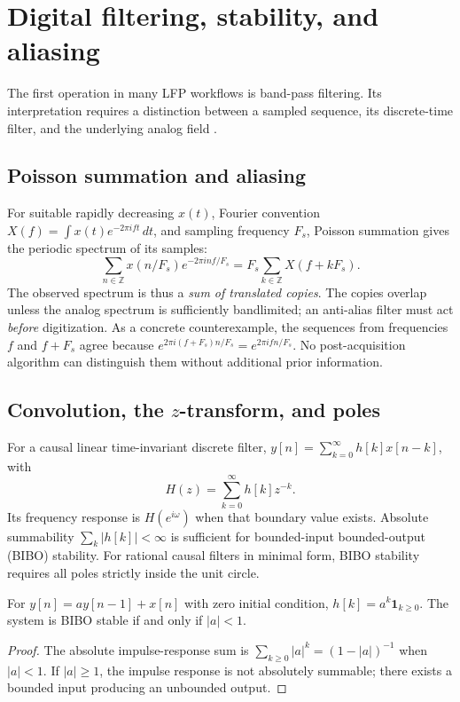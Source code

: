 \chapter{Digital filtering, stability, and aliasing}
\label{ch:filter-theory}
The first operation in many LFP workflows is band-pass filtering.
Its interpretation requires a distinction between a sampled sequence,
its discrete-time filter, and the underlying analog field
\cite{oppenheim2010}.

\section{Poisson summation and aliasing}
For suitable rapidly decreasing $x(t)$, Fourier convention
$X(f)=\int x(t)e^{-2\pi i f t}\,dt$, and sampling frequency $F_s$,
Poisson summation gives the periodic spectrum of its samples:
\[
\sum_{n\in\mathbb Z}x(n/F_s)e^{-2\pi i n f/F_s}
=F_s\sum_{k\in\mathbb Z}X(f+kF_s).
\]
The observed spectrum is thus a \emph{sum of translated copies}.
The copies overlap unless the analog spectrum is sufficiently
bandlimited; an anti-alias filter must act \emph{before} digitization.
As a concrete counterexample, the sequences from frequencies $f$
and $f+F_s$ agree because
$e^{2\pi i(f+F_s)n/F_s}=e^{2\pi ifn/F_s}$.
No post-acquisition algorithm can distinguish them without
additional prior information.

\section{Convolution, the $z$-transform, and poles}
For a causal linear time-invariant discrete filter,
$y[n]=\sum_{k=0}^\infty h[k]x[n-k]$, with
\[
H(z)=\sum_{k=0}^\infty h[k]z^{-k}.
\]
Its frequency response is $H(e^{i\omega})$ when that boundary
value exists. Absolute summability $\sum_k|h[k]|<\infty$
is sufficient for bounded-input bounded-output (BIBO) stability.
For rational causal filters in minimal form, BIBO stability
requires all poles strictly inside the unit circle.

\begin{proposition}
For $y[n]=a y[n-1]+x[n]$ with zero initial condition,
$h[k]=a^k\mathbf 1_{k\ge0}$. The system is BIBO stable
if and only if $|a|<1$.
\end{proposition}
\begin{proof}
The absolute impulse-response sum is
$\sum_{k\ge0}|a|^k=(1-|a|)^{-1}$ when $|a|<1$.
If $|a|\ge1$, the impulse response is not absolutely summable;
there exists a bounded input producing an unbounded output.
\end{proof}
